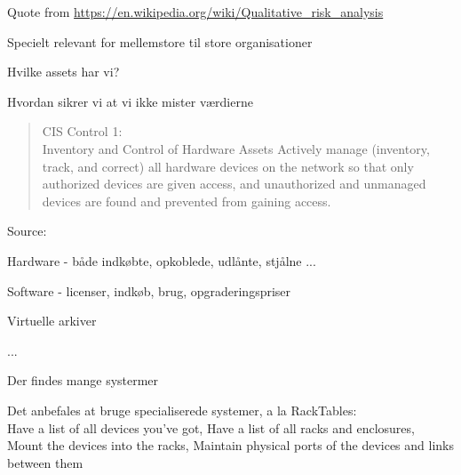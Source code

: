 \documentclass[Screen16to9,17pt]{foils}
\begin{document}
Quote from \url{https://en.wikipedia.org/wiki/Qualitative_risk_analysis}






\begin{list2}
\item Specielt relevant for mellemstore til store organisationer
\item Hvilke assets har vi?
\item Hvordan sikrer vi at vi ikke mister værdierne
\end{list2}



\begin{quote}
CIS Control 1:\\
Inventory and Control of Hardware Assets
Actively manage (inventory, track, and correct) all hardware devices on the network so that only
authorized devices are given access, and unauthorized and unmanaged devices are found and
prevented from gaining access.
\end{quote}
Source: 

\begin{list2}
\item Hardware - både indkøbte, opkoblede, udlånte, stjålne ...
\item Software - licenser, indkøb, brug, opgraderingspriser
\item Virtuelle arkiver
\item ...
\end{list2}



\begin{list2}
\item Der findes mange systermer
\item Det anbefales at bruge specialiserede systemer, a la RackTables:\\
Have a list of all devices you've got,
Have a list of all racks and enclosures,
Mount the devices into the racks,
Maintain physical ports of the devices and links between them
\end{list2}

\end{document}
